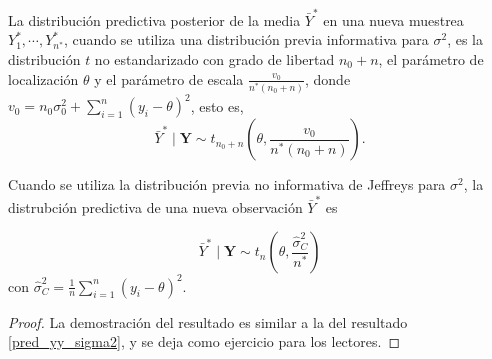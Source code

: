 \documentclass[10pt,openright]{book}\usepackage[]{graphicx}\usepackage[]{color}
\begin{document}
    \begin{Res}\label{pred_barY_sigma2}
    La distribuci\'on predictiva posterior de la media $\bar{Y}^* $ en una nueva muestrea $Y_1^*,\cdots,Y_{n^*}^*$, cuando se utiliza una distribuci\'on previa informativa para $\sigma^2$, es la distribuci\'on $t$ no estandarizado con grado de libertad $n_0+n$, el par\'ametro de localizaci\'on $\theta$ y el par\'ametro de escala $\frac{v_0}{n^*(n_0+n)}$, donde $v_0=n_0\sigma^2_0+\sum_{i=1}^n(y_i-\theta)^2$, esto es, 
    \begin{equation*}
    \bar{Y}^* \mid \mathbf{Y}\sim t_{n_0+n}\left(\theta,\frac{v_0}{n^*(n_0+n)}\right).
    \end{equation*} 
    
    Cuando se utiliza la distribuci\'on previa no informativa de Jeffreys para $\sigma^2$, la distrubci\'on predictiva de una nueva observaci\'on $\bar{Y}^*$ es
    
    \begin{equation*}
    \bar{Y}^* \mid \mathbf{Y}\sim t_n\left(\theta,\frac{\hat{\sigma}^2_C}{n^*}\right)
    \end{equation*} 
    con $\hat{\sigma}^2_C=\frac{1}{n}\sum_{i=1}^n(y_i-\theta)^2$. 
    \end{Res}
    
    \begin{proof}
    La demostraci\'on del resultado es similar a la del resultado \ref{pred_yy_sigma2}, y se deja como ejercicio para los lectores.
    \end{proof}
    
\end{document}
